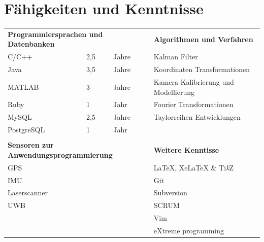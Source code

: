 \documentclass[a4paper,10pt]{article} %
\begin{document}
 
\section{Fähigkeiten und Kenntnisse}
 
\begin{tabular}{ll@{  }ll}
\multicolumn{3}{l}{\textbf{Programmiersprachen und Datenbanken}}   & \textbf{Algorithmen und Verfahren}\\
C/C++        & 2,5 & Jahre                                         & Kalman Filter \\
Java         & 3,5 & Jahre                                         & Koordinaten Transformationen \\ 
MATLAB       & 3   & Jahre                                         & Kamera Kalibrierung und Modellierung \\ 
Ruby         & 1   & Jahr                                          & Fourier Transformationen  \\ 
MySQL        & 2,5 & Jahre                                         & Taylorreihen Entwicklungen \\ 
PostgreSQL   & 1   & Jahr                                          & \\ 
             &     &                                               & \\ 
\multicolumn{3}{l}{\textbf{Sensoren zur Anwendungsprogrammierung}} & \textbf{Weitere Kenntisse}\\
GPS          &     &                                               & LaTeX, XeLaTeX \& Ti\textit{k}Z\\ 
IMU          &     &                                               & Git \\ 
Laserscanner &     &                                               & Subversion \\ 
UWB          &     &                                               & SCRUM \\ 
             &     &                                               & Vim \\
             &     &                                               & eXtreme programming 
\end{tabular}
 
 
\end{document}
